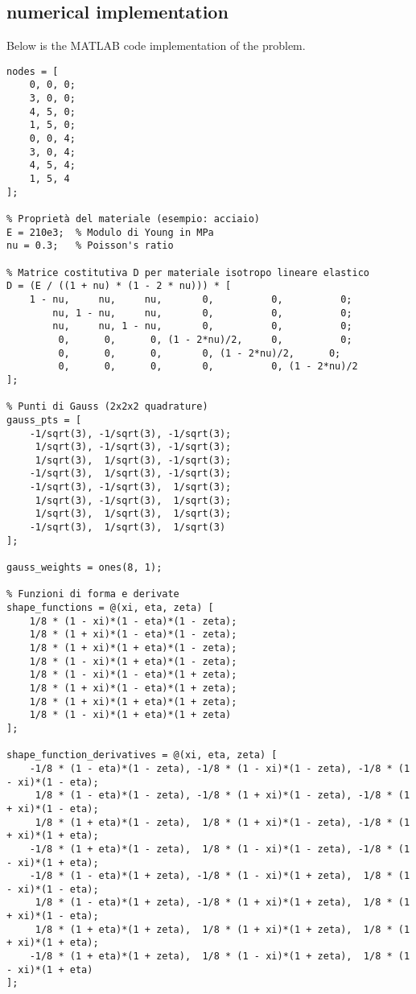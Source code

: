 \documentclass{article}
\begin{document}
\subsection{numerical implementation}
Below is the MATLAB code implementation of the problem. 
\begin{lstlisting}[caption={MATLAB Code for the stiffness matrix}, label={lst:stiffness matrix}]
% Definizione delle coordinate nodali
nodes = [
    0, 0, 0;
    3, 0, 0;
    4, 5, 0;
    1, 5, 0;
    0, 0, 4;
    3, 0, 4;
    4, 5, 4;
    1, 5, 4
];

% Proprietà del materiale (esempio: acciaio)
E = 210e3;  % Modulo di Young in MPa
nu = 0.3;   % Poisson's ratio

% Matrice costitutiva D per materiale isotropo lineare elastico
D = (E / ((1 + nu) * (1 - 2 * nu))) * [
    1 - nu,     nu,     nu,       0,          0,          0;
        nu, 1 - nu,     nu,       0,          0,          0;
        nu,     nu, 1 - nu,       0,          0,          0;
         0,      0,      0, (1 - 2*nu)/2,     0,          0;
         0,      0,      0,       0, (1 - 2*nu)/2,      0;
         0,      0,      0,       0,          0, (1 - 2*nu)/2
];

% Punti di Gauss (2x2x2 quadrature)
gauss_pts = [
    -1/sqrt(3), -1/sqrt(3), -1/sqrt(3);
     1/sqrt(3), -1/sqrt(3), -1/sqrt(3);
     1/sqrt(3),  1/sqrt(3), -1/sqrt(3);
    -1/sqrt(3),  1/sqrt(3), -1/sqrt(3);
    -1/sqrt(3), -1/sqrt(3),  1/sqrt(3);
     1/sqrt(3), -1/sqrt(3),  1/sqrt(3);
     1/sqrt(3),  1/sqrt(3),  1/sqrt(3);
    -1/sqrt(3),  1/sqrt(3),  1/sqrt(3)
];

gauss_weights = ones(8, 1);

% Funzioni di forma e derivate
shape_functions = @(xi, eta, zeta) [
    1/8 * (1 - xi)*(1 - eta)*(1 - zeta);
    1/8 * (1 + xi)*(1 - eta)*(1 - zeta);
    1/8 * (1 + xi)*(1 + eta)*(1 - zeta);
    1/8 * (1 - xi)*(1 + eta)*(1 - zeta);
    1/8 * (1 - xi)*(1 - eta)*(1 + zeta);
    1/8 * (1 + xi)*(1 - eta)*(1 + zeta);
    1/8 * (1 + xi)*(1 + eta)*(1 + zeta);
    1/8 * (1 - xi)*(1 + eta)*(1 + zeta)
];

shape_function_derivatives = @(xi, eta, zeta) [
    -1/8 * (1 - eta)*(1 - zeta), -1/8 * (1 - xi)*(1 - zeta), -1/8 * (1 - xi)*(1 - eta);
     1/8 * (1 - eta)*(1 - zeta), -1/8 * (1 + xi)*(1 - zeta), -1/8 * (1 + xi)*(1 - eta);
     1/8 * (1 + eta)*(1 - zeta),  1/8 * (1 + xi)*(1 - zeta), -1/8 * (1 + xi)*(1 + eta);
    -1/8 * (1 + eta)*(1 - zeta),  1/8 * (1 - xi)*(1 - zeta), -1/8 * (1 - xi)*(1 + eta);
    -1/8 * (1 - eta)*(1 + zeta), -1/8 * (1 - xi)*(1 + zeta),  1/8 * (1 - xi)*(1 - eta);
     1/8 * (1 - eta)*(1 + zeta), -1/8 * (1 + xi)*(1 + zeta),  1/8 * (1 + xi)*(1 - eta);
     1/8 * (1 + eta)*(1 + zeta),  1/8 * (1 + xi)*(1 + zeta),  1/8 * (1 + xi)*(1 + eta);
    -1/8 * (1 + eta)*(1 + zeta),  1/8 * (1 - xi)*(1 + zeta),  1/8 * (1 - xi)*(1 + eta)
];


\end{lstlisting}
\end{document}
